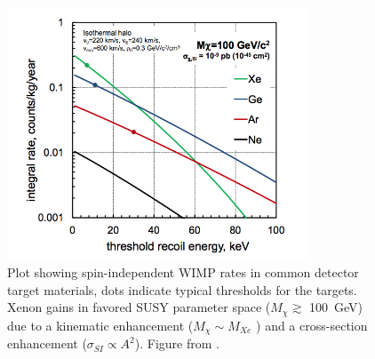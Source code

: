 \begin{figure}[htbp]
\begin{center}
\includegraphics[width=0.8\textwidth]{figures/lxetpcs/wimp_rates.png}
\caption{Plot showing spin-independent \acs{WIMP} rates in common detector target materials, dots indicate typical thresholds for the targets. Xenon gains in favored \acs{SUSY} parameter space ($M_{\chi} \gtrsim$ 100~GeV) due to a kinematic enhancement ($M_{\chi} \sim M_{Xe}$ ) and a cross-section enhancement ($\sigma_{SI} \propto A^{2}$). Figure from \cite{Chepel2013}.}
\label{fig:wimp_rates}
\end{center}
\end{figure}

